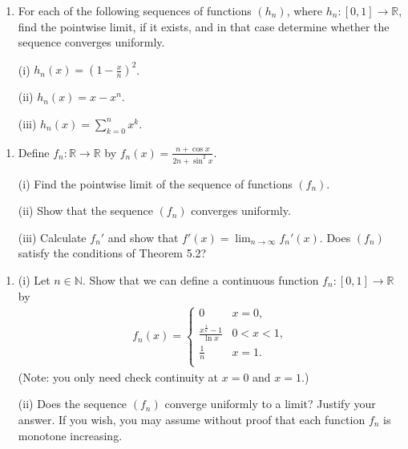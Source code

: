 \documentclass[letterpaper,10pt,english]{jupyterBook}
\begin{document}
\label{\detokenize{Problems:id57}}\begin{enumerate}
%
\setcounter{enumi}{56}
\item {} 
\sphinxAtStartPar
For each of the following sequences of functions \((h_n)\), where \(h_n\colon [0,1]\rightarrow \mathbb{R}\), find the pointwise limit, if it exists, and in that case determine whether the sequence converges uniformly.

\sphinxAtStartPar
(i) \(h_n(x) = \left(1-\frac{x}{n}\right)^2\).

\sphinxAtStartPar
(ii) \(h_n(x) = x-x^n\).

\sphinxAtStartPar
(iii) \(h_n (x) = \sum_{k=0}^n x^k\).

\end{enumerate}
\label{\detokenize{Problems:id58}}\begin{enumerate}
%
\setcounter{enumi}{57}
\item {} 
\sphinxAtStartPar
Define \(f_n\colon \mathbb{R}\rightarrow \mathbb{R}\) by \(f_n (x) = \frac{n+\cos x}{2n+\sin^2 x}\).

\sphinxAtStartPar
(i) Find the pointwise limit of the sequence of functions \((f_n)\).

\sphinxAtStartPar
(ii) Show that the sequence \((f_n)\) converges uniformly.

\sphinxAtStartPar
(iii) Calculate \(f_n'\) and show that \(f'(x) = \lim_{n\rightarrow \infty} f_n'(x)\). Does \((f_n)\) satisfy the conditions of Theorem 5.2?

\end{enumerate}
\label{\detokenize{Problems:id59}}\begin{enumerate}
%
\setcounter{enumi}{58}
\item {} 
\sphinxAtStartPar
(i) Let \(n\in \mathbb{N}\). Show that we can define a continuous function \(f_n\colon [0,1]\rightarrow \mathbb{R}\) by
\begin{equation*}
\begin{split}
    f_n(x) = \left\{ \begin{array}{ll}
    \displaystyle 0 & x=0, \\
    \displaystyle\frac{x^{\frac{1}{n}}-1}{\ln x} & 0<x<1, \\
    \displaystyle\frac{1}{n} & x=1. \\
    \end{array} \right.
    \end{split}
\end{equation*}
\sphinxAtStartPar
(Note: you only need check continuity at \(x=0\) and \(x=1\).)

\sphinxAtStartPar
(ii) Does the sequence \((f_n)\) converge  uniformly to a limit? Justify your answer. If you wish, you may assume without proof that each function \(f_n\) is monotone increasing.

\end{enumerate}
\end{document}
